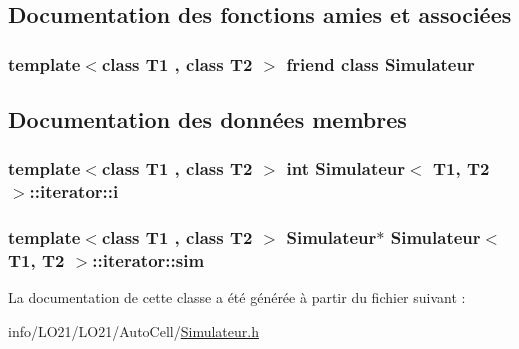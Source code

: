 \subsection{Documentation des fonctions amies et associées}
\subsubsection[{\texorpdfstring{Simulateur}{Simulateur}}]{\setlength{\rightskip}{0pt plus 5cm}template$<$class T1 , class T2 $>$ friend class {\bf Simulateur}\hspace{0.3cm}{\ttfamily [friend]}}\hypertarget{class_simulateur_1_1iterator_ae6c3966e699bf920c86e0bd006bd8183}{}\label{class_simulateur_1_1iterator_ae6c3966e699bf920c86e0bd006bd8183}


\subsection{Documentation des données membres}
\subsubsection[{\texorpdfstring{i}{i}}]{\setlength{\rightskip}{0pt plus 5cm}template$<$class T1 , class T2 $>$ int {\bf Simulateur}$<$ T1, T2 $>$\+::iterator\+::i\hspace{0.3cm}{\ttfamily [private]}}\hypertarget{class_simulateur_1_1iterator_ac4a7c0f2c42b4b85f598b36674b1d772}{}\label{class_simulateur_1_1iterator_ac4a7c0f2c42b4b85f598b36674b1d772}
\subsubsection[{\texorpdfstring{sim}{sim}}]{\setlength{\rightskip}{0pt plus 5cm}template$<$class T1 , class T2 $>$ {\bf Simulateur}$\ast$ {\bf Simulateur}$<$ T1, T2 $>$\+::iterator\+::sim\hspace{0.3cm}{\ttfamily [private]}}\hypertarget{class_simulateur_1_1iterator_aefe7dba8b546a3b2baabe60dfbed43f8}{}\label{class_simulateur_1_1iterator_aefe7dba8b546a3b2baabe60dfbed43f8}


La documentation de cette classe a été générée à partir du fichier suivant \+:\begin{DoxyCompactItemize}
\item 
info/\+L\+O21/\+L\+O21/\+Auto\+Cell/\hyperlink{_simulateur_8h}{Simulateur.\+h}\end{DoxyCompactItemize}

